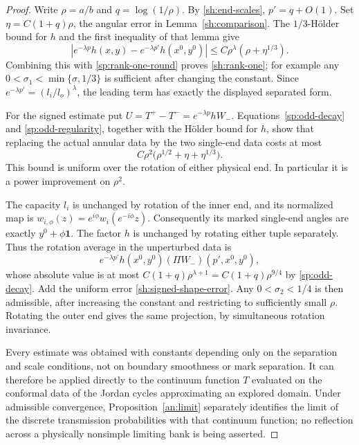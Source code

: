 \begin{proof}
Write $\rho=a/b$ and $q=\log(1/\rho)$.  By
\eqref{sh:end-scales}, $p'=q+O(1)$.  Set
$\eta=C(1+q)\rho$, the angular error in
Lemma~\ref{sh:comparison}.  The $1/3$-H\"older bound for $h$
and the first inequality of that lemma give
\[
 |e^{-\lambda p}h(x,y)-e^{-\lambda p'}h(x^0,y^0)|
       \le C\rho^\lambda(\rho+\eta^{1/3}).
\]
Combining this with \eqref{sp:rank-one-round} proves
\eqref{sh:rank-one}; for example any
$0<\sigma_1<\min\{\sigma,1/3\}$ is sufficient after changing
the constant.  Since
$e^{-\lambda p'}=(l_i/l_o)^\lambda$, the leading term has exactly
the displayed separated form.

For the signed estimate put $U=T^+-T^-=e^{-\lambda p}hW_-$.
Equations~\eqref{sp:odd-decay} and
\eqref{sp:odd-regularity}, together with the H\"older bound for
$h$, show that replacing the actual annular data by the two
single-end data costs at most
\begin{equation}\label{sh:signed-shape-error}
 C\rho^2\bigl(\rho^{1/2}+\eta+\eta^{1/3}\bigr).
\end{equation}
This bound is uniform over the rotation of either physical end.
In particular it is a power improvement on $\rho^2$.

The capacity $l_i$ is unchanged by rotation of the inner end, and
its normalized map is
$w_{i,\phi}(z)=e^{i\phi}w_i(e^{-i\phi}z)$.
Consequently its marked single-end angles are exactly
$y^0+\phi\mathbf1$.  The factor $h$ is unchanged by rotating
either tuple separately.  Thus the rotation average in the unperturbed
data is
\[
 e^{-\lambda p'}h(x^0,y^0)
                       (\Pi W_-)(p',x^0,y^0),
\]
whose absolute value is at most
$C(1+q)\rho^{\lambda+1}=C(1+q)\rho^{9/4}$ by
\eqref{sp:odd-decay}.  Add the uniform error
\eqref{sh:signed-shape-error}.
Any $0<\sigma_2<1/4$ is then admissible, after increasing the
constant and restricting to sufficiently small $\rho$.
Rotating the outer end gives the same projection, by simultaneous
rotation invariance.

Every estimate was obtained with constants depending only on the
separation and scale conditions, not on boundary smoothness or mark
separation.  It can therefore be applied directly to the continuum
function $T$ evaluated on the conformal data of the Jordan cycles
approximating an explored domain.  Under admissible convergence,
Proposition~\ref{an:limit} separately identifies the limit of the
discrete transmission probabilities with that continuum function; no
reflection across a physically nonsimple limiting bank is being
asserted.
\end{proof}
